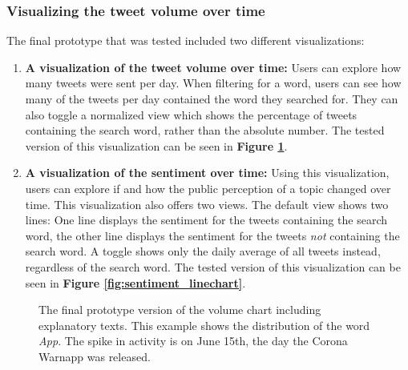 \subsubsection{Visualizing the tweet volume over time}
The final prototype that was tested included two different visualizations:

\begin{enumerate}
    \item \textbf{A visualization of the tweet volume over time:} Users can explore how many tweets were sent per day. When filtering for a word, users can see how many of the tweets per day contained the word they searched for. They can also toggle a normalized view which shows the percentage of tweets containing the search word, rather than the absolute number. The tested version of this visualization can be seen in \textbf{Figure \ref{fig:volume_barchart}}.
    \item \textbf{A visualization of the sentiment over time:} Using this visualization, users can explore if and how the public perception of a topic changed over time. This visualization also offers two views. The default view shows two lines: One line displays the sentiment for the tweets containing the search word, the other line displays the sentiment for the tweets \emph{not} containing the search word. A toggle shows only the daily average of all tweets instead, regardless of the search word. The tested version of this visualization can be seen in \textbf{Figure \ref{fig:sentiment_linechart}}.
\end{enumerate}

\begin{figure}[htb!]
    \caption{The final prototype version of the volume chart including explanatory texts. This example shows the distribution of the word \emph{App}. The spike in activity is on June 15th, the day the Corona Warnapp was released.}
    \label{fig:volume_barchart}
\end{figure}

